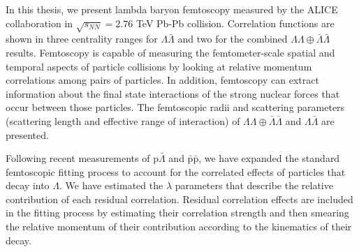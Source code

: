 In this thesis, we present lambda baryon femtoscopy measured by the ALICE collaboration in $\sqrt{s_{NN}}=2.76$ TeV Pb-Pb collision.
Correlation functions are shown in three centrality ranges for $\Lambda\bar{\Lambda}$ and two for the combined $\Lambda\Lambda\oplus\bar{\Lambda}\bar{\Lambda}$ results.
Femtoscopy is capable of measuring the femtometer-scale spatial and temporal aspects of particle collisions by looking at relative momentum correlations among pairs of particles.
In addition, femtoscopy can extract information about the final state interactions of the strong nuclear forces that occur between those particles.
The femtoscopic radii and scattering parameters (scattering length and effective range of interaction) of $\Lambda\Lambda\oplus\bar{\Lambda}\bar{\Lambda}$ and $\Lambda\bar{\Lambda}$ are presented.

Following recent measurements of $\mathrm{p}\bar{\Lambda}$ and $\bar{\mathrm{p}}\bar{\mathrm{p}}$, we have expanded the standard femtoscopic fitting process to account for the correlated effects of particles that decay into $\Lambda$.
We have estimated the $\lambda$ parameters that describe the relative contribution of each residual correlation.
Residual correlation effects are included in the fitting process by estimating their correlation strength and then smearing the relative momentum of their contribution according to the kinematics of their decay.

